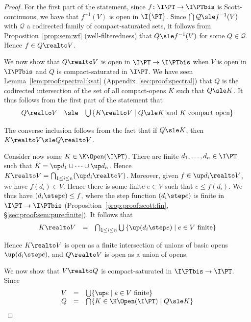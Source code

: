 \begin{proof}
For the first part of the statement,
since $f \colon \I\PT \to \I\PTbis$ is Scott-continuous,
we have that $f^{-1}(V)$ is open in $\I{\PT}$.
Since $\bigcap\mathcal{Q} \sle f^{-1}(V)$
with $\mathcal{Q}$ a codirected family of compact-saturated sets,
it follows from Proposition~\ref{prop:sem:wf} (well-filteredness)
that $Q \sle f^{-1}(V)$ for some $Q \in \mathcal{Q}$.
Hence $f \in Q \realto V$.

We now show that $Q \realto V$ is open in $\I\PT \to \I\PTbis$
when $V$ is open in $\I\PTbis$ and $Q$ is compact-saturated in $\I\PT$.
We have seen Lemma~\ref{lem:proof:spectral:ksat} (Appendix~\ref{sec:proof:spectral})
that $Q$ is the codirected intersection of the set of all compact-opens
$K$ such that $Q \sle K$.
It thus follows from the first part of the statement that
\[
\begin{array}{l l l}
  Q \realto V
& \sle
& \bigcup\left\{
  K \realto V
  \mid \text{$Q \sle K$ and $K$ compact open}
  \right\}
\end{array}
\]

\noindent
The converse inclusion follows from the fact that if $Q \sle K$,
then $K \realto V \sle Q \realto V$.

Consider now some $K \in \K\Open(\I\PT)$.
There are finite $d_1,\dots,d_n \in \I\PT$
such that $K = \up d_1 \cup \dots \cup \up d_n$.
Hence $K \realto V = \bigcap_{1 \leq i \leq n} (\up d_i \realto V)$.
Moreover, given $f \in \up d_i \realto V$,
we have $f(d_i) \in V$.
Hence there is some finite $e \in V$
such that $e \leq f(d_i)$.
We thus have $(d_i \step e) \leq f$,
where the step function $(d_i \step e)$ is finite in $\I\PT \to \I\PTbis$
(Proposition~\ref{prop:proof:scott:fin}, \S\ref{sec:proof:sem:pure:finite}).
It follows that 
\[
\begin{array}{l l l}
  K \realto V
& =
& \bigcap_{1 \leq i \leq n}
  \bigcup \left\{
  \up(d_i \step e)
  \mid
  \text{$e \in V$ finite}
  \right\}
\end{array}
\]

Hence $K \realto V$ is open as a finite intersection of unions
of basic opens $\up(d_i \step e)$,
and $Q \realto V$ is open as a union of opens.

We now show that $V \realto Q$ is compact-saturated in $\I\PTbis \to \I\PT$.
Since
\[
\begin{array}{r c l}
  V
& =
& \bigcup \{ \up e \mid \text{$e \in V$ finite} \}
\\
%
  Q
& =
& \bigcap \{ K \in \K\Open(\I\PT) \mid Q \sle K \}
\end{array}
\]


\end{proof}
